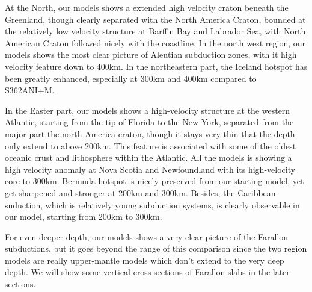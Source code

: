 \documentclass[extra,mreferee]{gji}
\begin{document}
At the North, our models shows a extended high velocity craton beneath the 
Greenland, though clearly separated with the North America Craton,
bounded at the relatively low velocity structure at Barffin Bay and Labrador
Sea, with North American Craton followed nicely with the coastline. In the
north west region, our models shows the most clear picture of
Aleutian subduction zones, with it high velocity feature down to 400km.
In the northeastern part, the Iceland hotspot has been greatly enhanced,
especially at 300km and 400km compared to S362ANI+M.

In the Easter part, our models shows a high-velocity structure at the western
Atlantic, starting from the tip of Florida to the New York,
separated from the major part the north America craton,
though it stays very thin that the depth only extend to above 200km.
This feature is associated with some of the oldest oceanic crust and lithosphere
within the Atlantic\citep{muller2008, schaeffer2014imaging}.
All the models is showing a high velocity anomaly at Nova Scotia and Newfoundland
with its high-velocity core to 300km.
Bermuda hotspot is nicely preserved from our starting
model, yet get sharpened and stronger at 200km and 300km. Besides, the
Caribbean suduction, which is relatively young subduction systems, is clearly
observable in our model, starting from 200km to 300km.

For even deeper depth, our models shows a very clear picture of the Farallon
subductions, but it goes beyond the range of this comparison since the two
region models are really upper-mantle models which don't extend to the very
deep depth. We will show some vertical cross-sections of Farallon slabs in
the later sections.
\end{document}

